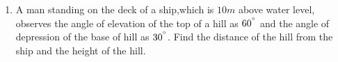 \documentclass{article}
\begin{document}
\begin{enumerate}

\item A man standing on the deck of a ship,which is $10 m$ above water level, observes the angle of elevation of the top of a hill as $60^{\degree}$ and the angle of depression of the base of hill as $30^{\degree}$. Find the distance of the hill from the ship and the height of the hill.

\end{enumerate}
\end{document}
